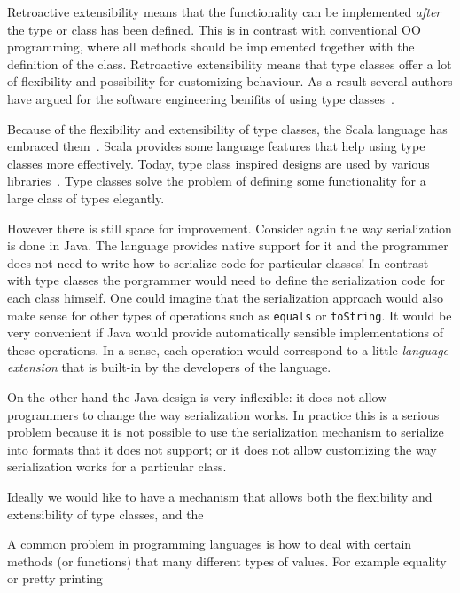 \documentclass[preprint]{sigplanconf}
\begin{document}
Retroactive extensibility means that the functionality can be implemented
\emph{after} the type or class has been defined. This is in contrast
with conventional OO programming, where all methods should be
implemented together with the definition of the class. Retroactive
extensibility means that type classes offer a lot of flexibility and
possibility for customizing behaviour. As a result several authors
have argued for the software engineering benifits of using type classes~\cite{}.

Because of the flexibility and extensibility of type classes, the
Scala language has embraced them~\cite{}. Scala provides some language
features that help using type classes more effectively. Today, type
class inspired designs are used by various libraries~\cite{}.  Type
classes solve the problem of defining some functionality for a large
class of types elegantly.

However there is still space for improvement. Consider again the way
serialization is done in Java. The language provides native support
for it and the programmer does not need to write how to serialize code
for particular classes!  In contrast with type classes the porgrammer
would need to define the serialization code for each class himself.
One could imagine that the serialization approach would also make
sense for other types of operations such as \lstinline{equals} or
\lstinline{toString}.  It would be very convenient if Java would
provide automatically sensible implementations of these operations.
In a sense, each operation would correspond to a little \emph{language
  extension} that is built-in by the developers of the language.



On the other hand the Java
design is very inflexible: it does not allow programmers to change
the way serialization works. In practice this is a serious problem
because it is not possible to use the serialization mechanism to
serialize into formats that it does not support; or it does not allow
customizing the way serialization works for a particular class.

Ideally we would like to have a mechanism that allows both the
flexibility and extensibility of type classes, and the

A common problem in programming languages is how to deal with
certain methods (or functions) that  many different types of values.
For example equality or pretty printing

\end{document}
